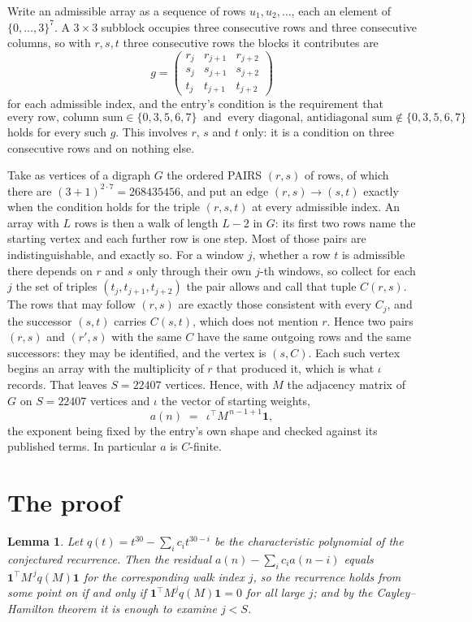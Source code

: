 \documentclass[11pt,a4paper]{article}
\theoremstyle{plain}
\newtheorem{lemma}[theorem]{Lemma}
\theoremstyle{definition}
\begin{document}
Write an admissible array as a sequence of rows $u_1,u_2,\dots$, each an element of
$\{0,\dots,3\}^{7}$. A $3\times3$ subblock occupies three consecutive rows and
three consecutive columns, so with $r,s,t$ three consecutive rows the blocks it
contributes are
\[
g=\begin{pmatrix}r_j&r_{j+1}&r_{j+2}\\ s_j&s_{j+1}&s_{j+2}\\ t_j&t_{j+1}&t_{j+2}\end{pmatrix}
\]
for each admissible index, and the entry's condition is the requirement that
\[
\text{every row, column sum} \in \{0,3,5,6,7\}\ \text{ and }\ \text{every diagonal, antidiagonal sum} \notin \{0,3,5,6,7\}
\]
holds for every such $g$. This involves $r$, $s$ and $t$ only: it is a condition on
three consecutive rows and on nothing else.

Take as vertices of a digraph $G$ the ordered PAIRS $(r,s)$ of rows, of which there are
$(3+1)^{2\cdot7}=268435456$, and put an edge $(r,s)\to(s,t)$ exactly when the condition
holds for the triple $(r,s,t)$ at every admissible index. An array with $L$ rows is then a
walk of length $L-2$ in $G$: its first two rows name the starting vertex and each further
row is one step. Most of those pairs are indistinguishable, and exactly so. For a window $j$, whether a row $t$ is admissible there depends on $r$ and $s$ only through their own $j$-th windows, so collect for each $j$ the set of triples $(t_j,t_{j+1},t_{j+2})$ the pair allows and call that tuple $C(r,s)$. The rows that may follow $(r,s)$ are exactly those consistent with every $C_j$, and the successor $(s,t)$ carries $C(s,t)$, which does not mention $r$. Hence two pairs $(r,s)$ and $(r',s)$ with the same $C$ have the same outgoing rows and the same successors: they may be identified, and the vertex is $(s,C)$. Each such vertex begins an array with the multiplicity of $r$ that produced it, which is what $\iota$ records. That leaves $S=22407$ vertices. Hence, with $M$ the adjacency matrix of $G$ on $S=22407$ vertices and
$\iota$ the vector of starting weights,
\[
a(n)\;=\;\,\iota^{\!\top}M^{\,n-1+1}\mathbf{1},
\]
the exponent being fixed by the entry's own shape and checked against its published terms.
In particular $a$ is $C$-finite.

\section{The proof}

\begin{lemma}\label{lem:crit}
Let $q(t)=t^{30}-\sum_i c_it^{30-i}$ be the characteristic polynomial of the
conjectured recurrence. Then the residual $a(n)-\sum_ic_ia(n-i)$ equals
$\mathbf{1}^{\!\top}M^{\,j}q(M)\mathbf{1}$ for the corresponding walk index
$j$, so the recurrence holds from some point on if and only if
$\mathbf{1}^{\!\top}M^{j}q(M)\mathbf{1}=0$ for all large $j$; and by the
Cayley--Hamilton theorem it is enough to examine $j<S$.
\end{lemma}
\end{document}
